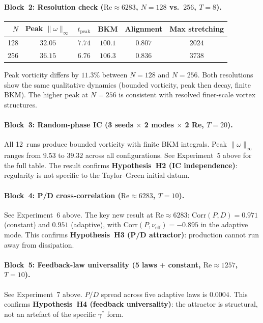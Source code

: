 \paragraph{Block~2: Resolution check
($\mathrm{Re} \approx 6283$, $N = 128$ vs.\ $256$, $T = 8$).}
\begin{center}
\begin{tabular}{@{}rccccc@{}}
\toprule
$N$ & Peak $\|\omega\|_\infty$ & $t_{\mathrm{peak}}$
    & BKM & Alignment & Max stretching\\
\midrule
128 & $32.05$ & $7.74$ & $100.1$ & $0.807$ & $2024$\\
256 & $36.15$ & $6.76$ & $106.3$ & $0.836$ & $3738$\\
\bottomrule
\end{tabular}
\end{center}
Peak vorticity differs by $11.3\%$ between $N=128$ and $N=256$.
Both resolutions show the same qualitative dynamics (bounded
vorticity, peak then decay, finite BKM).  The higher peak at
$N=256$ is consistent with resolved finer-scale vortex
structures.

\paragraph{Block~3: Random-phase IC
(3 seeds $\times$ 2 modes $\times$ 2 Re, $T = 20$).}
All 12~runs produce bounded vorticity with finite BKM integrals.
Peak $\|\omega\|_\infty$ ranges from $9.53$ to $39.32$ across
all configurations.  See Experiment~5 above for the full table.
The result confirms \textbf{Hypothesis~H2 (IC independence)}:
regularity is not specific to the Taylor--Green initial datum.

\paragraph{Block~4: P/D cross-correlation
($\mathrm{Re} \approx 6283$, $T = 10$).}
See Experiment~6 above.  The key new result at
$\mathrm{Re}\approx 6283$: $\mathrm{Corr}(P,D) = 0.971$
(constant) and $0.951$ (adaptive), with
$\mathrm{Corr}(P,\nu_{\mathrm{eff}}) = -0.895$ in the
adaptive mode.  This confirms
\textbf{Hypothesis~H3 (P/D attractor)}: production cannot
run away from dissipation.

\paragraph{Block~5: Feedback-law universality
(5 laws $+$ constant, $\mathrm{Re} \approx 1257$, $T = 10$).}
See Experiment~7 above.  $P/D$ spread across five adaptive
laws is $0.0004$.  This confirms
\textbf{Hypothesis~H4 (feedback universality)}: the attractor
is structural, not an artefact of the specific $\gamma^*$ form.

